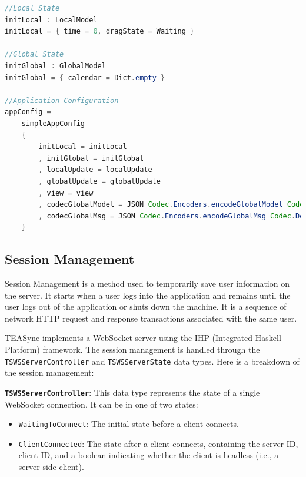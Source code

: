 \begin{lstlisting}[language=Java, caption=TEASync Calendar State, label=lst:java, mathescape=true]
//Local State
initLocal : LocalModel
initLocal = { time = 0, dragState = Waiting }

//Global State
initGlobal : GlobalModel
initGlobal = { calendar = Dict.empty }

//Application Configuration
appConfig =
    simpleAppConfig
    { 
        initLocal = initLocal
        , initGlobal = initGlobal
        , localUpdate = localUpdate
        , globalUpdate = globalUpdate
        , view = view
        , codecGlobalModel = JSON Codec.Encoders.encodeGlobalModel Codec.Decoders.decodeGlobalModel
        , codecGlobalMsg = JSON Codec.Encoders.encodeGlobalMsg Codec.Decoders.decodeGlobalMsg
    }

\end{lstlisting}

\subsection{Session Management}
Session Management is a method used to temporarily save user information on the server. It starts when a user logs into the application and remains until the user logs out of the application or shuts down the machine. It is a sequence of network HTTP request and response transactions associated with the same user.

TEASync implements a WebSocket server using the IHP (Integrated Haskell Platform) framework. The session management is handled through the \lstinline{TSWSServerController} and \lstinline{TSWSServerState} data types.
Here is a breakdown of the session management:

\textbf{\lstinline{TSWSServerController}}: This data type represents the state of a single WebSocket connection. It can be in one of two states:

\begin{itemize}
    \item \lstinline{WaitingToConnect}: The initial state before a client connects.
    \item \lstinline{ClientConnected}: The state after a client connects, containing the server ID, client ID, and a boolean indicating whether the client is headless (i.e., a server-side client).
\end{itemize}

